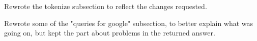 \documentclass{sig-alternate}
\begin{document}
Rewrote the tokenize subsection to reflect the changes requested.

Rewrote some of the "queries for google" subsection, to better explain what was going on, but kept the part about problems in the returned answer.



%
%
\end{document}
